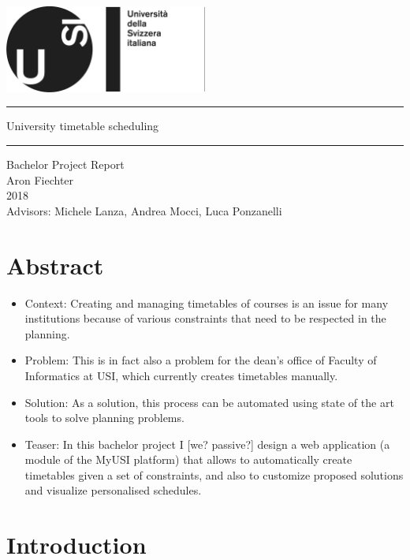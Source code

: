 \documentclass[12pt, a4paper, english]{report}
\begin{document}
\begin{titlepage}
\begin{center}
~\\[2cm]
\includegraphics[width=0.5\textwidth]{logo}\\[3.5cm]
\hrule height 1pt
\vspace{5mm}
{\Huge University timetable scheduling}
\vspace{3mm}
\hrule height 1pt
\vspace{1cm}
{\Large Bachelor Project Report}\\[3mm]
{\Large Aron Fiechter}\\[3mm]
{\Large 2018}\\[3.5cm]
{\large Advisors: Michele Lanza, Andrea Mocci, Luca Ponzanelli}
\end{center}
\end{titlepage}

\tableofcontents
\newpage
\section*{Abstract}
\begin{itemize}[label=\(\triangleright\)]
\item Context: Creating and managing timetables of courses is an issue for many institutions because of various constraints that need to be respected in the planning. 
\item Problem: This is in fact also a problem for the dean's office of Faculty of Informatics at USI, which currently creates timetables manually.
\item Solution: As a solution, this process can be automated using state of the art tools to solve planning problems.
\item Teaser: In this bachelor project I [we? passive?] design a web application (a module of the MyUSI platform) that allows to automatically create timetables given a set of constraints, and also to customize proposed solutions and visualize personalised schedules.
\end{itemize}
\section{Introduction}
\end{document}
